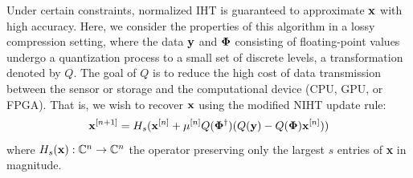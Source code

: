 \documentclass{article}
\begin{document}
Under certain constraints, normalized IHT is guaranteed to approximate ${\bf x}$ with high accuracy. Here, we consider the properties of this algorithm in a lossy compression setting, where the data ${\bf y}$ and ${\bf \Phi}$ consisting of floating-point values undergo a quantization process to a small set of discrete levels, a transformation denoted by $Q$. 
The goal of $Q$ is to reduce the high cost of data transmission between the sensor or storage and the computational device (CPU, GPU, or FPGA). That is, we wish to recover ${\bf x}$ using the  modified NIHT update rule:
 \begin{equation}
 \small
     {\bf x}^{[n+1]} = H_s({\bf x}^{[n]} + \mu^{[n]}Q({\bf \Phi}^{\dagger})(Q({\bf y}) - Q({\bf \Phi}){\bf x}^{[n]}))
 \end{equation}
where $H_s({\bf x}): \mathbb{C}^n \rightarrow \mathbb{C}^n$ the operator preserving only the largest $s$  entries of {\bf x} in magnitude. 
 
     
\end{document}
